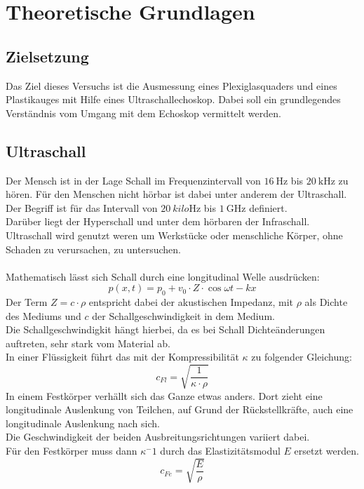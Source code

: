 \newpage
\section{Theoretische Grundlagen}


\subsection{Zielsetzung}
Das Ziel dieses Versuchs ist die Ausmessung eines Plexiglasquaders und eines Plastikauges mit Hilfe eines Ultraschallechoskop. 
Dabei soll ein grundlegendes Verständnis vom Umgang mit dem Echoskop vermittelt werden.

\subsection{Ultraschall}

\noindent
Der Mensch ist in der Lage Schall im Frequenzintervall von $\SI{16}{\hertz}$ bis $\SI{20}{\kilo\hertz}$ zu hören. 
Für den Menschen nicht hörbar ist dabei unter anderem der Ultraschall. 
Der Begriff ist für das Intervall von $\SI{20}{kilo\hertz}$ bis $\SI{1}{\giga\hertz}$ definiert.\\
Darüber liegt der Hyperschall und unter dem hörbaren der Infraschall.\\
Ultraschall wird genutzt weren um Werkstücke oder menschliche Körper, ohne Schaden zu verursachen, zu untersuchen.\\\\

\noindent
Mathematisch lässt sich Schall durch eine longitudinal Welle ausdrücken:
\begin{equation*}
    p(x,t)=p_0+v_0\cdot Z\cdot \cos{\omega t-kx}
\end{equation*}
Der Term $Z=c\cdot \rho$ entspricht dabei der akustischen Impedanz, mit $\rho$ als Dichte des Mediums und $c$ der Schallgeschwindigkeit in dem Medium.\\
Die Schallgeschwindigkit hängt hierbei, da es bei Schall Dichteänderungen auftreten, sehr stark vom Material ab.\\
In einer Flüssigkeit führt das mit der Kompressibilität $\kappa$ zu folgender Gleichung:
\begin{equation*}
    c_{Fl}=\sqrt{\frac{1}{\kappa\cdot\rho}}
\end{equation*}
In einem Festkörper verhällt sich das Ganze etwas anders. 
Dort zieht eine longitudinale Auslenkung von Teilchen, auf Grund der Rückstellkräfte, auch eine longitudinale Auslenkung nach sich.\\
Die Geschwindigkeit der beiden Ausbreitungsrichtungen variiert dabei.\\
Für den Festkörper muss dann $\kappa^-1$ durch das Elastizitätsmodul $E$ ersetzt werden.
\begin{equation*}
    c_{Fe}=\sqrt{\frac{E}{\rho}}
\end{equation*}


